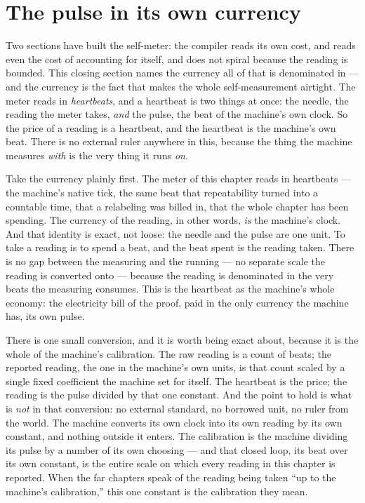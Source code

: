 \section{The pulse in its own currency}

Two sections have built the self-meter: the compiler reads its own cost, and reads even the cost of accounting for
itself, and does not spiral because the reading is bounded. This closing section names the currency all of that is
denominated in --- and the currency is the fact that makes the whole self-measurement airtight. The meter reads in
\emph{heartbeats}, and a heartbeat is two things at once: the needle, the reading the meter takes, \emph{and} the pulse,
the beat of the machine's own clock. So the price of a reading is a heartbeat, and the heartbeat is the machine's own
beat. There is no external ruler anywhere in this, because the thing the machine measures \emph{with} is the very thing
it runs \emph{on}.

Take the currency plainly first. The meter of this chapter reads in heartbeats --- the machine's native tick, the same
beat that repeatability turned into a countable time, that a relabeling was billed in, that the whole chapter has been
spending. The currency of the reading, in other words, \emph{is} the machine's clock. And that identity is exact, not
loose: the needle and the pulse are one unit. To take a reading is to spend a beat, and the beat spent is the reading
taken. There is no gap between the measuring and the running --- no separate scale the reading is converted onto ---
because the reading is denominated in the very beats the measuring consumes. This is the heartbeat as the machine's whole
economy: the electricity bill of the proof, paid in the only currency the machine has, its own pulse.

There is one small conversion, and it is worth being exact about, because it is the whole of the machine's calibration.
The raw reading is a count of beats; the reported reading, the one in the machine's own units, is that count scaled by a
single fixed coefficient the machine set for itself. The heartbeat is the price; the reading is the pulse divided by that
one constant. And the point to hold is what is \emph{not} in that conversion: no external standard, no borrowed unit, no
ruler from the world. The machine converts its own clock into its own reading by its own constant, and nothing outside it
enters. The calibration is the machine dividing its pulse by a number of its own choosing --- and that closed loop, its
beat over its own constant, is the entire scale on which every reading in this chapter is reported. When the far chapters
speak of the reading being taken ``up to the machine's calibration,'' this one constant is the calibration they mean.

